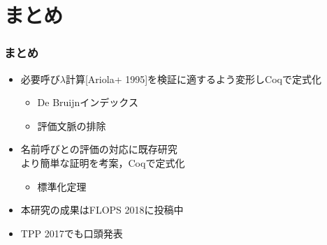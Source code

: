 \documentclass[dvipdfmx,cjk,xcolor=dvipsnames,envcountsect,notheorems,12pt]{beamer}
\theoremstyle{definition}
\begin{document}
\section{まとめ}

\begin{frame}
	\frametitle{まとめ}
	\begin{itemize}
		\item 必要呼び$\lambda$計算[Ariola+ 1995]を検証に適するよう変形しCoqで定式化
			\begin{itemize}
				\item De Bruijnインデックス
				\item 評価文脈の排除
			\end{itemize}
		\item 名前呼びとの評価の対応に既存研究\\より簡単な証明を考案，Coqで定式化
			\begin{itemize}
				\item 標準化定理
			\end{itemize}
		\item 本研究の成果はFLOPS 2018に投稿中
		\item TPP 2017でも口頭発表
	\end{itemize}
\end{frame}
\end{document}
